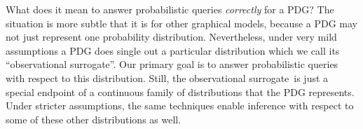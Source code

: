 \documentclass[twoside]{article}
\newcommand\obslimit{observational surrogate} %
\begin{document}
What does it mean to answer probabilistic queries \emph{correctly} for a PDG?
The situation is more subtle that it is for other graphical models, because a PDG may
not just represent one probability distribution.
Nevertheless, under very mild assumptions a PDG does single out a particular distribution which we call its ``\obslimit''.
Our primary goal is to answer probabilistic queries with respect to this distribution.
Still, the \obslimit\ is just a special endpoint of a continuous family of  distributions that the PDG represents.  
Under stricter assumptions, 
 the same techniques enable inference with respect to some of these other distributions as well.

\end{document}

